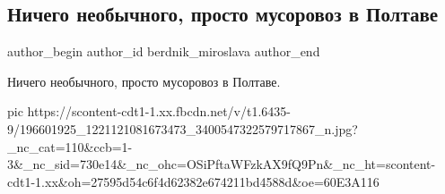  
 
 
 
 
 
\subsection{Ничего необычного, просто мусоровоз в Полтаве}
\label{sec:07_06_2021.fb.berdnik_miroslava.3.musorovoz}
\ifcmt
 author_begin
   author_id berdnik_miroslava
 author_end
\fi

Ничего необычного, просто мусоровоз в Полтаве.

\ifcmt
  pic https://scontent-cdt1-1.xx.fbcdn.net/v/t1.6435-9/196601925_1221121081673473_3400547322579717867_n.jpg?_nc_cat=110&ccb=1-3&_nc_sid=730e14&_nc_ohc=OSiPftaWFzkAX9fQ9Pn&_nc_ht=scontent-cdt1-1.xx&oh=27595d54c6f4d62382e674211bd4588d&oe=60E3A116
\fi

